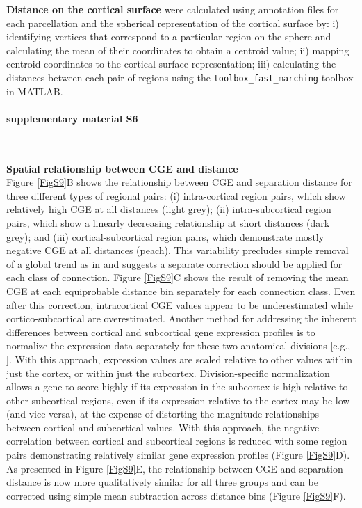 \documentclass[10pt,A4]{article}
\begin{document}
\textbf{Distance on the cortical surface} were calculated using annotation files for each parcellation and the spherical representation of the cortical surface by: i) identifying vertices that correspond to a particular region on the sphere and calculating the mean of their coordinates to obtain a centroid value; ii) mapping centroid coordinates to the cortical surface representation; iii) calculating the distances between each pair of regions using the \texttt{toolbox\_fast\_marching} toolbox in MATLAB.

\paragraph*{supplementary material S6}\mbox{}\\
\label{SItext6}

\textbf{Spatial relationship between CGE and distance}\\
Figure \ref{FigS9}B shows the relationship between CGE and separation distance for three different types of regional pairs: (i) intra-cortical region pairs, which show relatively high CGE at all distances (light grey); (ii) intra-subcortical region pairs, which show a linearly decreasing relationship at short distances (dark grey); and (iii) cortical-subcortical region pairs, which demonstrate mostly negative CGE at all distances (peach). This variability precludes simple removal of a global trend as in \citep{Fulcher2016} and suggests a separate correction should be applied for each class of connection. Figure \ref{FigS9}C shows the result of removing the mean CGE at each equiprobable distance bin separately for each connection class. Even after this correction, intracortical CGE values appear to be underestimated while cortico-subcortical are overestimated. Another method for addressing the inherent differences between cortical and subcortical gene expression profiles is to normalize the expression data separately for these two anatomical divisions [e.g., \citet{Anderson2018}]. With this approach, expression values are scaled relative to other values within just the cortex, or within just the subcortex. Division-specific normalization allows a gene to score highly if its expression in the subcortex is high relative to other subcortical regions, even if its expression relative to the cortex may be low (and vice-versa), at the expense of distorting the magnitude relationships between cortical and subcortical values. With this approach, the negative correlation between cortical and subcortical regions is reduced with some region pairs demonstrating relatively similar gene expression profiles (Figure \ref{FigS9}D). As presented in Figure \ref{FigS9}E, the relationship between CGE and separation distance is now more qualitatively similar for all three groups and can be corrected using simple mean subtraction across distance bins (Figure \ref{FigS9}F). 
\end{document}
